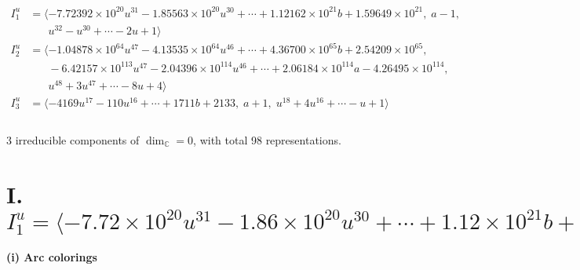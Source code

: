 \documentclass[1p]{elsarticle_modified}
\theoremstyle{definition}
\begin{document}
\begin{align*}
I^u_{1}&=\langle 
-7.72392\times10^{20} u^{31}-1.85563\times10^{20} u^{30}+\cdots+1.12162\times10^{21} b+1.59649\times10^{21},\;a-1,\\
\phantom{I^u_{1}}&\phantom{= \langle  }u^{32}- u^{30}+\cdots-2 u+1\rangle \\
I^u_{2}&=\langle 
-1.04878\times10^{64} u^{47}-4.13535\times10^{64} u^{46}+\cdots+4.36700\times10^{65} b+2.54209\times10^{65},\\
\phantom{I^u_{2}}&\phantom{= \langle  }-6.42157\times10^{113} u^{47}-2.04396\times10^{114} u^{46}+\cdots+2.06184\times10^{114} a-4.26495\times10^{114},\\
\phantom{I^u_{2}}&\phantom{= \langle  }u^{48}+3 u^{47}+\cdots-8 u+4\rangle \\
I^u_{3}&=\langle 
-4169 u^{17}-110 u^{16}+\cdots+1711 b+2133,\;a+1,\;u^{18}+4 u^{16}+\cdots- u+1\rangle \\
\\
\end{align*}
\raggedright * 3 irreducible components of $\dim_{\mathbb{C}}=0$, with total 98 representations.\\
\newpage
\renewcommand{\arraystretch}{1}
\centering \section*{I. $I^u_{1}= \langle -7.72\times10^{20} u^{31}-1.86\times10^{20} u^{30}+\cdots+1.12\times10^{21} b+1.60\times10^{21},\;a-1,\;u^{32}- u^{30}+\cdots-2 u+1 \rangle$}
\flushleft \textbf{(i) Arc colorings}\\
\end{document}
